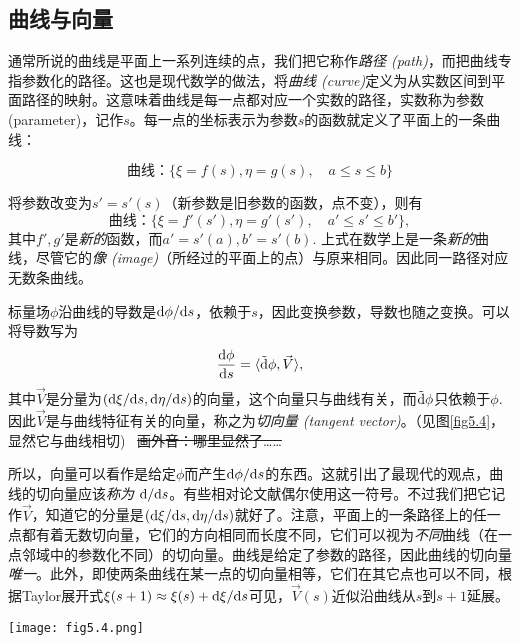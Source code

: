 \subsection*{曲线与向量}
通常所说的曲线是平面上一系列连续的点，我们把它称作\textit{路径 (path)}，而把曲线专指参数化的路径。这也是现代数学的做法，将\textit{曲线 (curve)}定义为从实数区间到平面路径的映射。这意味着曲线是每一点都对应一个实数的路径，实数称为参数(parameter)，记作$s$。每一点的坐标表示为参数$s$的函数就定义了平面上的一条曲线：
\begin{shaded}
\begin{equation}
    \text{曲线：} \{ \xi = f(s), \eta = g(s), \quad a \le s \le b \}
\label{equ5.17}
\end{equation}
\end{shaded}
将参数改变为$s' = s'(s)$（新参数是旧参数的函数，点不变），则有
\begin{equation}
    \text{曲线：} \{ \xi = f'(s'), \eta = g'(s'), \quad a' \le s' \le b' \},
\label{equ5.18}
\end{equation}
其中$f', g'$是\textit{新的}函数，而$a' = s'(a), b' = s'(b)$. 上式在数学上是一条\textit{新的}曲线，尽管它的\textit{像 (image)}（所经过的平面上的点）与原来相同。因此同一路径对应无数条曲线。

标量场$\phi$沿曲线的导数是$\mathrm{d} \phi / \mathrm{d} s$，依赖于$s$，因此变换参数，导数也随之变换。可以将导数写为
\begin{equation}
    \frac{\mathrm{d} \phi}{\mathrm{d} s} = \langle \tilde{\mathrm{d}} \phi, \vec{V} \rangle,
\label{equ5.19}
\end{equation}
其中$\vec{V}$是分量为$(\mathrm{d} \xi / \mathrm{d} s, \mathrm{d} \eta / \mathrm{d} s)$的向量，这个向量只与曲线有关，而$\tilde{\mathrm{d}} \phi$只依赖于$\phi$. 因此$\vec{V}$是与曲线特征有关的向量，称之为\textit{切向量 (tangent vector)}。（见图\ref{fig5.4}，显然它与曲线相切) \ \sout{画外音：哪里显然了……}

所以，向量可以看作是给定$\phi$而产生$\mathrm{d} \phi / \mathrm{d} s$的东西。这就引出了最现代的观点，曲线的切向量应该\textit{称为} $\mathrm{d} / \mathrm{d} s$。有些相对论文献偶尔使用这一符号。不过我们把它记作$\vec{V}$，知道它的分量是$(\mathrm{d} \xi / \mathrm{d} s, \mathrm{d} \eta / \mathrm{d} s)$就好了。注意，平面上的一条路径上的任一点都有着无数切向量，它们的方向相同而长度不同，它们可以视为\textit{不同}曲线（在一点邻域中的参数化不同）的切向量。曲线是给定了参数的路径，因此曲线的切向量\textit{唯一}。此外，即使两条曲线在某一点的切向量相等，它们在其它点也可以不同，根据Taylor展开式$\xi (s + 1) \approx \xi (s) + \mathrm{d} \xi / \mathrm{d} s$可见，$\vec{V} (s)$近似沿曲线从$s$到$s + 1$延展。

{
    \centering
    \texttt{[image: fig5.4.png]}
    \label{fig5.4}
}

